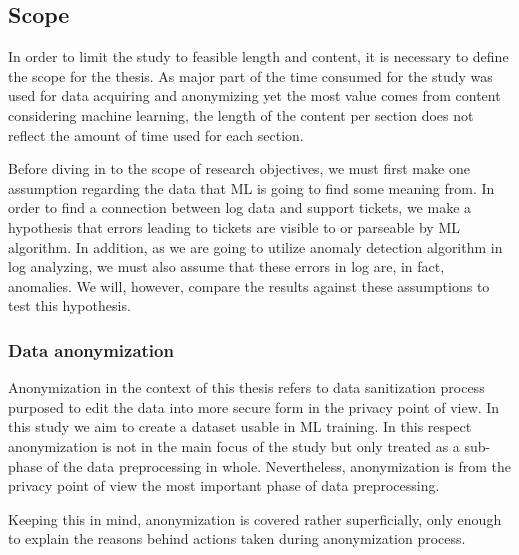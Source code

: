
\subsection{Scope}\label{subsec:intro-scope}

In order to limit the study
to feasible length and content,
it is necessary to define the scope for the thesis.
As major part of the time consumed for the study
was used for data acquiring and anonymizing
yet the most value comes from
content considering machine learning,
the length of the content per section
does not reflect
the amount of time used for each section.

Before diving in to the scope of research objectives,
we must first make one assumption regarding the data
that ML is going to find some meaning from.
In order to find a connection between log data and support tickets,
we make a hypothesis that errors leading to tickets
are visible to or parseable by ML algorithm.
In addition,
as we are going to utilize anomaly detection algorithm in log analyzing,
we must also assume that these errors in log
are, in fact, anomalies.
We will, however,
compare the results against these assumptions
to test this hypothesis.


\subsubsection*{Data anonymization}
Anonymization in the context of this thesis
refers to data sanitization process
purposed to edit the data into
more secure form in the privacy point of view.
In this study we aim to
create a dataset usable in ML training.
In this respect
anonymization is not in the main focus of the study
but only treated as a sub-phase
of the data preprocessing in whole.
Nevertheless,
anonymization is from the privacy point of view
the most important phase of data preprocessing.

Keeping this in mind,
anonymization is covered rather superficially,
only enough to explain the reasons
behind actions taken during anonymization process.


